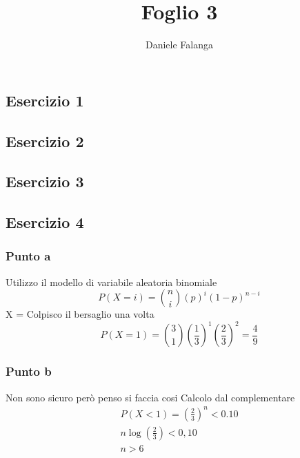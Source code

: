 \documentclass[12pt]{article}
\title{\textbf{Foglio 3}}
\author{Daniele Falanga}
\date{}
\begin{document}
\maketitle

\subsection*{Esercizio 1}


\subsection*{Esercizio 2}


\subsection*{Esercizio 3}


\subsection*{Esercizio 4}
\subsubsection*{Punto a}
Utilizzo il modello di variabile aleatoria binomiale
\[
P(X=i) = \binom{n}{i} (p)^i (1-p)^{n-i}    
\]
X = Colpisco il bersaglio una volta
\[
P(X=1) = \binom{3}{1} \left(\frac{1}{3}\right)^1 \left(\frac{2}{3}\right)^2 = \frac{4}{9}   
\]  

\subsubsection*{Punto b}
Non sono sicuro però penso si faccia cosi
\newline
Calcolo dal complementare
\begin{align*}
    P(X<1) = \left(\frac{2}{3}\right)^n < 0.10 \\
    n\log(\frac{2}{3}) < 0,10 \\
    n > 6
\end{align*}
\end{document}
